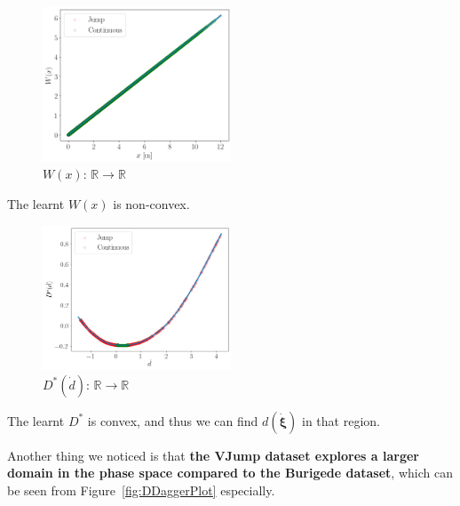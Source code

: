 \begin{figure}[H]
    \centering
    \includegraphics[width=0.5\textwidth]{images/Trial0216_combined_800_W.png}
    \caption{$W(x)$: $\mathbb{R}\rightarrow \mathbb{R}$}
    \label{fig:WPlot}
\end{figure}
The learnt $W(x)$ is non-convex. 

\begin{figure}[H]
    \centering
    \includegraphics[width=0.5\textwidth]{images/Trial0216_combined_800_D_star.png}
    \caption{$D^*(\dot{d})$: $\mathbb{R}\rightarrow \mathbb{R}$}
    \label{fig:DStarPlot}
\end{figure}
The learnt $D^*$ is convex, 
and thus we can find $d(\dot{\bm{\xi}})$ in that region.  

Another thing we noticed is that
\textbf{the VJump dataset explores a larger domain in the phase space compared to the Burigede dataset}, 
which can be seen from Figure~\ref{fig:DDaggerPlot} especially. 

\newpage
